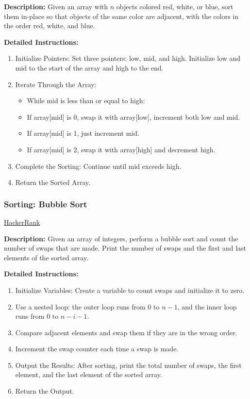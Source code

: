 \textbf{Description:} Given an array with $n$ objects colored red, white, or blue, sort them in-place so that objects of the same color are adjacent, with the colors in the order red, white, and blue.

\textbf{Detailed Instructions:}
\begin{enumerate}
    \item Initialize Pointers: Set three pointers: low, mid, and high. Initialize low and mid to the start of the array and high to the end.
    \item Iterate Through the Array:
    \begin{itemize}
        \item While mid is less than or equal to high:
        \item If array[mid] is 0, swap it with array[low], increment both low and mid.
        \item If array[mid] is 1, just increment mid.
        \item If array[mid] is 2, swap it with array[high] and decrement high.
    \end{itemize}
    \item Complete the Sorting: Continue until mid exceeds high.
    \item Return the Sorted Array.
\end{enumerate}

\subsubsection{Sorting: Bubble Sort}
\href{https://www.hackerrank.com/challenges/30-sorting/problem}{HackerRank}

\textbf{Description:} Given an array of integers, perform a bubble sort and count the number of swaps that are made. Print the number of swaps and the first and last elements of the sorted array.

\textbf{Detailed Instructions:}
\begin{enumerate}
    \item Initialize Variables: Create a variable to count swaps and initialize it to zero.
    \item Use a nested loop: the outer loop runs from 0 to $n-1$, and the inner loop runs from 0 to $n-i-1$.
    \item Compare adjacent elements and swap them if they are in the wrong order.
    \item Increment the swap counter each time a swap is made.
    \item Output the Results: After sorting, print the total number of swaps, the first element, and the last element of the sorted array.
    \item Return the Output.
\end{enumerate}

